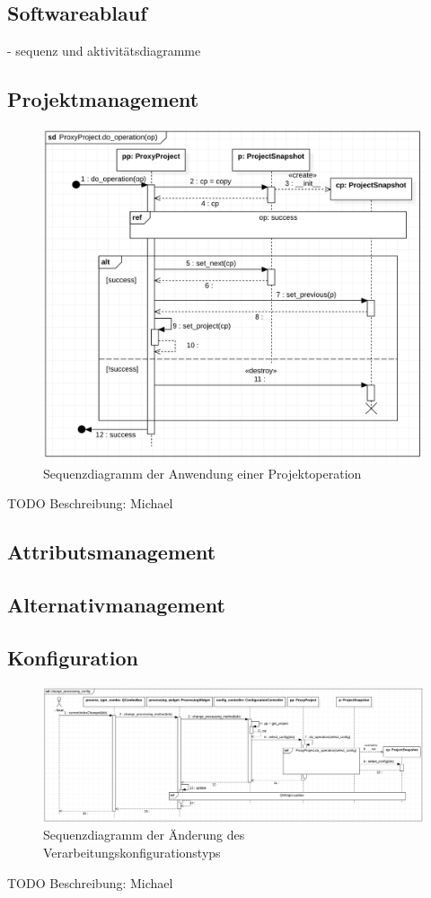 \documentclass{article}
\begin{document}
\begin{itemize}
\newpage
\section{Softwareablauf}
- sequenz und aktivitätsdiagramme
\subsection{Projektmanagement}

\begin{figure}[H]%
    \centering
    \includegraphics[width=13cm]{entwurf/Entwurf_dokument/img/Michael/sd_ProxyProject.do_operation.png}
    \caption{Sequenzdiagramm der Anwendung einer Projektoperation}
\end{figure}
TODO Beschreibung: Michael

\subsection{Attributsmanagement}
\subsection{Alternativmanagement}
\subsection{Konfiguration}
\begin{figure}[H]%
    \centering
    \includegraphics[width=13cm]{entwurf/Entwurf_dokument/img/Michael/sd_change_processing_config.png}
    \caption{Sequenzdiagramm der Änderung des Verarbeitungskonfigurationstyps}
\end{figure}
TODO Beschreibung: Michael


\end{itemize}
\end{document}
